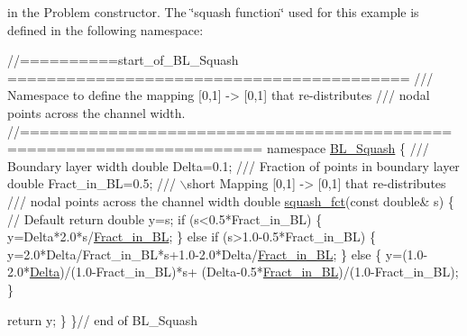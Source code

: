 \begin{DoxyEnumerate}
\begin{DoxyCodeInclude}
\end{DoxyCodeInclude}
 in the Problem constructor. The \char`\"{}squash function\char`\"{} used for this example is defined in the following namespace\+:  
\begin{DoxyCodeInclude}
\textcolor{comment}{//==========start\_of\_BL\_Squash =========================================}
\textcolor{comment}{/// Namespace to define the mapping [0,1] -> [0,1] that re-distributes}
\textcolor{comment}{}\textcolor{comment}{/// nodal points across the channel width.}
\textcolor{comment}{}\textcolor{comment}{//======================================================================}
\textcolor{keyword}{namespace }\hyperlink{namespaceBL__Squash}{BL\_Squash}
\{
 \textcolor{comment}{}
\textcolor{comment}{ /// Boundary layer width}
\textcolor{comment}{} \textcolor{keywordtype}{double} Delta=0.1;
\textcolor{comment}{}
\textcolor{comment}{ /// Fraction of points in boundary layer}
\textcolor{comment}{} \textcolor{keywordtype}{double} Fract\_in\_BL=0.5;
\textcolor{comment}{}
\textcolor{comment}{ /// \(\backslash\)short Mapping [0,1] -> [0,1] that re-distributes}
\textcolor{comment}{ /// nodal points across the channel width}
\textcolor{comment}{} \textcolor{keywordtype}{double} \hyperlink{namespaceBL__Squash_a0fdaf7661591150041b7102dbe578cdc}{squash\_fct}(\textcolor{keyword}{const} \textcolor{keywordtype}{double}& s)
 \{
  \textcolor{comment}{// Default return}
  \textcolor{keywordtype}{double} y=s;
  \textcolor{keywordflow}{if} (s<0.5*Fract\_in\_BL)
   \{
    y=Delta*2.0*s/\hyperlink{namespaceBL__Squash_af84bda39008884cd2b01e630957573df}{Fract\_in\_BL};
   \}
  \textcolor{keywordflow}{else} \textcolor{keywordflow}{if} (s>1.0-0.5*Fract\_in\_BL)
   \{
    y=2.0*Delta/Fract\_in\_BL*s+1.0-2.0*Delta/\hyperlink{namespaceBL__Squash_af84bda39008884cd2b01e630957573df}{Fract\_in\_BL};
   \}
  \textcolor{keywordflow}{else}
   \{
    y=(1.0-2.0*\hyperlink{namespaceBL__Squash_a3c4183891049bca81f3a011db24fc579}{Delta})/(1.0-Fract\_in\_BL)*s+
      (Delta-0.5*\hyperlink{namespaceBL__Squash_af84bda39008884cd2b01e630957573df}{Fract\_in\_BL})/(1.0-Fract\_in\_BL);
   \}

  \textcolor{keywordflow}{return} y;
 \}
\}\textcolor{comment}{// end of BL\_Squash}


\end{DoxyCodeInclude}
\end{DoxyEnumerate}
